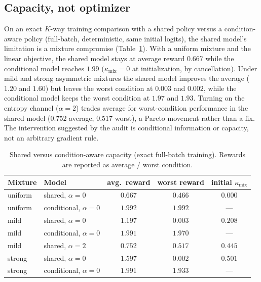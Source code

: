 \documentclass{article}
\newcommand{\kmix}{\kappa_{\mathrm{mix}}}
\begin{document}
\subsection{Capacity, not optimizer}
\label{sec:exp-capacity}

On an exact $K$-way training comparison with a shared policy versus a
condition-aware policy (full-batch, deterministic, same initial logits), the
shared model's limitation is a mixture compromise
(Table~\ref{tab:capacity}). With a uniform mixture and the linear objective,
the shared model stays at average reward $0.667$ while the conditional model
reaches $1.99$ ($\kmix=0$ at initialization, by cancellation). Under mild and
strong asymmetric mixtures the shared model improves the average ($1.20$ and
$1.60$) but leaves the worst condition at $0.003$ and $0.002$, while the
conditional model keeps the worst condition at $1.97$ and $1.93$. Turning on
the entropy channel ($\alpha=2$) trades average for worst-condition
performance in the shared model ($0.752$ average, $0.517$ worst), a Pareto
movement rather than a fix. The intervention suggested by the audit is
conditional information or capacity, not an arbitrary gradient rule.

\begin{table}[t]
\caption{Shared versus condition-aware capacity (exact full-batch training).
Rewards are reported as average / worst condition.}
\label{tab:capacity}
\begin{center}
\begin{tabular}{llccc}
\toprule
Mixture & Model & avg.\ reward & worst reward & initial $\kmix$ \\
\midrule
uniform & shared, $\alpha{=}0$ & $0.667$ & $0.466$ & $0.000$ \\
uniform & conditional, $\alpha{=}0$ & $1.992$ & $1.992$ & — \\
mild & shared, $\alpha{=}0$ & $1.197$ & $0.003$ & $0.208$ \\
mild & conditional, $\alpha{=}0$ & $1.991$ & $1.970$ & — \\
mild & shared, $\alpha{=}2$ & $0.752$ & $0.517$ & $0.445$ \\
strong & shared, $\alpha{=}0$ & $1.597$ & $0.002$ & $0.501$ \\
strong & conditional, $\alpha{=}0$ & $1.991$ & $1.933$ & — \\
\bottomrule
\end{tabular}
\end{center}
\end{table}
\end{document}
